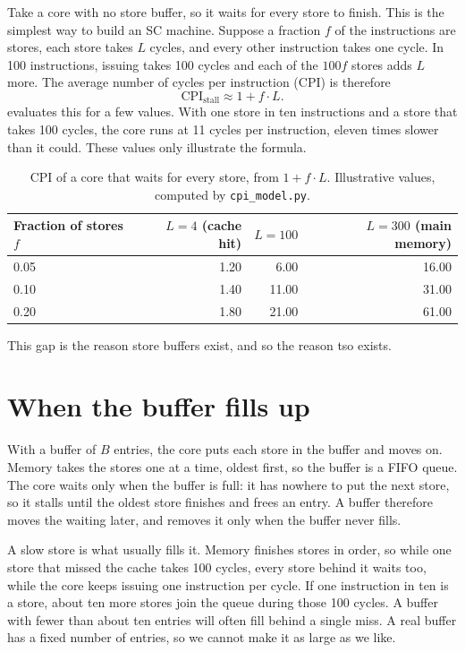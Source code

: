 Take a core with no store buffer, so it waits for every store to finish. This is the simplest way to build an SC machine. Suppose a fraction $f$ of the instructions are stores, each store takes $L$ cycles, and every other instruction takes one cycle. In 100 instructions, issuing takes 100 cycles and each of the $100f$ stores adds $L$ more. The average number of cycles per instruction (CPI) is therefore
\[
\text{CPI}_{\text{stall}} \approx 1 + f \cdot L.
\]
 evaluates this for a few values. With one store in ten instructions and a store that takes 100 cycles, the core runs at 11 cycles per instruction, eleven times slower than it could. These values only illustrate the formula.

\begin{table}[!htbp]
\centering\small
\caption{CPI of a core that waits for every store, from $1 + f\cdot L$. Illustrative values, computed by \texttt{cpi\_model.py}.}
\label{tab:boe}
\begin{tabular}{@{}lrrr@{}}
\toprule
Fraction of stores $f$ & $L = 4$ (cache hit) & $L = 100$ & $L = 300$ (main memory)\\
\midrule
0.05 & 1.20 & 6.00 & 16.00\\
0.10 & 1.40 & 11.00 & 31.00\\
0.20 & 1.80 & 21.00 & 61.00\\
\bottomrule
\end{tabular}
\end{table}

This gap is the reason store buffers exist, and so the reason \gls{tso} exists.

\section{When the buffer fills up}
\label{sec:buffervsfull}

With a buffer of $B$ entries, the core puts each store in the buffer and moves on. Memory takes the stores one at a time, oldest first, so the buffer is a FIFO queue. The core waits only when the buffer is full: it has nowhere to put the next store, so it stalls until the oldest store finishes and frees an entry. A buffer therefore moves the waiting later, and removes it only when the buffer never fills.

A slow store is what usually fills it. Memory finishes stores in order, so while one store that missed the cache takes 100 cycles, every store behind it waits too, while the core keeps issuing one instruction per cycle. If one instruction in ten is a store, about ten more stores join the queue during those 100 cycles. A buffer with fewer than about ten entries will often fill behind a single miss. A real buffer has a fixed number of entries, so we cannot make it as large as we like.

